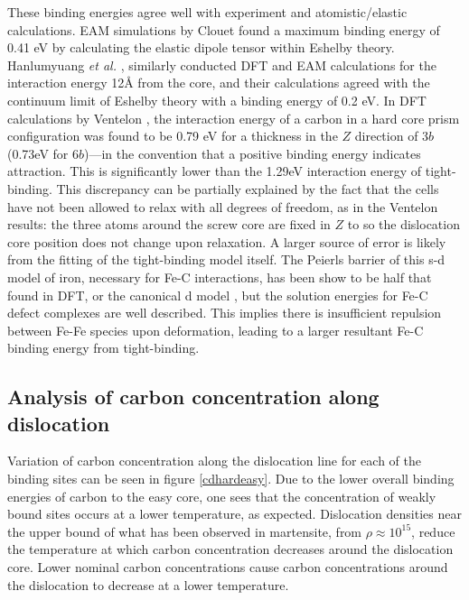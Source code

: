 \documentclass[a4paper,11pt]{article}
\begin{document}
These binding energies agree well with experiment and atomistic/elastic calculations. EAM simulations
by Clouet \cite{Clouet2008,Becquart2007} found a maximum binding energy of 0.41 eV by calculating
the elastic dipole tensor within Eshelby theory. Hanlumyuang \emph{et al.} \cite{Hanlumyuang2010},
similarly conducted DFT and EAM calculations for the interaction energy 12\AA{} from the core, and
their calculations agreed with the continuum limit of Eshelby theory with a binding energy of
0.2 eV. In DFT calculations by Ventelon \cite{Ventelon2015}, the interaction energy of a carbon in a
hard core prism configuration was found to be 0.79 eV for a thickness in the \(Z\) direction of
3\(b\) (0.73eV for \(6b\))---in the convention that a positive binding energy indicates
attraction. This is significantly lower than the 1.29eV interaction energy of tight-binding.
This discrepancy can be partially explained by the fact that the cells have not been allowed to
relax with all degrees of freedom, as in the Ventelon results: the three atoms around the screw
core are fixed in \(Z\) to so the dislocation core position does not change upon relaxation. A
larger source of error is likely from the fitting of the tight-binding model itself. The
Peierls barrier of this s-d model of iron, necessary for Fe-C interactions, has been show to be
half that found in DFT, or the canonical d model \cite{Simpson2019}, but the solution energies for
Fe-C defect complexes are well described. This implies there is insufficient repulsion between
Fe-Fe species upon deformation, leading to a larger resultant Fe-C binding energy from tight-binding.




\subsection{Analysis of carbon concentration along dislocation}
\label{sec:org8db1a01}

Variation of carbon concentration along the dislocation line for each of the binding sites can be
seen in figure \ref{cdhardeasy}. Due to the lower overall binding energies of carbon to the easy core, one
sees that the concentration of weakly bound sites occurs at a lower temperature, as
expected. Dislocation densities near the upper bound of what has been observed in martensite,
from \(\rho \approx10^{15}\), reduce the temperature at which carbon concentration decreases around the
dislocation core. Lower nominal carbon concentrations cause carbon concentrations
around the dislocation to decrease at a lower temperature. 
\end{document}
